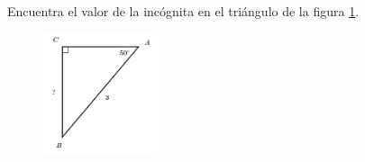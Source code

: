 \question[15]  Encuentra el valor de la incógnita en el triángulo de la figura \ref{fig:lados_functrig_05}.
\begin{figure}[H]
    \begin{center}
        \includegraphics[width=0.3\textwidth]{../images/lados_functrig_05.png}
    \end{center}
    \caption{}
    \label{fig:lados_functrig_05}
\end{figure}